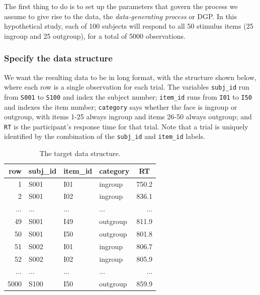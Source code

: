 \documentclass[doc,floatsintext]{apa6}
\begin{document}
The first thing to do is to set up the parameters that govern the
process we assume to give rise to the data, the \emph{data-generating
process} or DGP. In this hypothetical study, each of 100 subjects will
respond to all 50 stimulus items (25 ingroup and 25 outgroup), for a
total of 5000 observations.

\subsubsection{Specify the data
structure}\label{specify-the-data-structure}

We want the resulting data to be in long format, with the structure
shown below, where each row is a single observation for each trial. The
variables \texttt{subj\_id} run from \texttt{S001} to \texttt{S100} and
index the subject number; \texttt{item\_id} runs from \texttt{I01} to
\texttt{I50} and indexes the item number; \texttt{category} says whether
the face is ingroup or outgroup, with items 1-25 always ingroup and
items 26-50 always outgroup; and \texttt{RT} is the participant's
response time for that trial. Note that a trial is uniquely identified
by the combination of the \texttt{subj\_id} and \texttt{item\_id}
labels.

\begin{table}[H]
\begin{center}
\begin{threeparttable}
\caption{\label{tab:data-example}The target data structure.}
\begin{tabular}{rlllr}
\toprule
row & \multicolumn{1}{c}{subj\_id} & \multicolumn{1}{c}{item\_id} & \multicolumn{1}{c}{category} & \multicolumn{1}{c}{RT}\\
\midrule
1 & S001 & I01 & ingroup & 750.2\\
2 & S001 & I02 & ingroup & 836.1\\
... & ... & ... & ... & ...\\
49 & S001 & I49 & outgroup & 811.9\\
50 & S001 & I50 & outgroup & 801.8\\
51 & S002 & I01 & ingroup & 806.7\\
52 & S002 & I02 & ingroup & 805.9\\
... & ... & ... & ... & ...\\
5000 & S100 & I50 & outgroup & 859.9\\
\bottomrule
\end{tabular}
\end{threeparttable}
\end{center}
\end{table}
\end{document}
